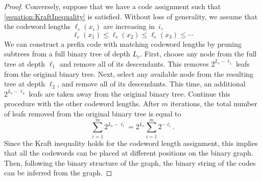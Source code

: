 \begin{proof}
Conversely, suppose that we have a code assignment such that \eqref{equation:KraftInequality} is satisfied.
Without loss of generality, we assume that the codeword lengths $\ell_c(x_i)$ are increasing in~$i$,
\begin{equation*}
\ell_c(x_1) \leq \ell_c(x_2) \leq \ell_c(x_3) \leq \cdots
\end{equation*}
We can construct a prefix code with matching codeword lengths by pruning subtrees from a  full binary tree of depth $L_c$.
First, choose any node from the full tree at depth $\ell_1$ and remove all of its descendants.
This removes $2^{L_c -\ell_1}$ leafs from the original binary tree.
Next, select any available node from the resulting tree at depth $\ell_2$, and remove all of its descendants.
This time, an additional $2^{L_c - \ell_2}$ leafs are taken away from the original binary tree.
Continue this procedure with the other codeword lengths.
After $m$ iterations, the total number of leafs removed from the original binary tree is equal to
\begin{equation*}
\sum_{i=1}^m 2^{L_c - \ell_i} = 2^{L_c} \sum_{i=1}^m 2^{-\ell_i} .
\end{equation*}
Since the Kraft inequality holds for the codeword length assignment, this implies that all the codewords can be placed at different positions on the binary graph.
Then, following the binary structure of the graph, the binary string of the codes can be inferred from the graph.
\end{proof}

